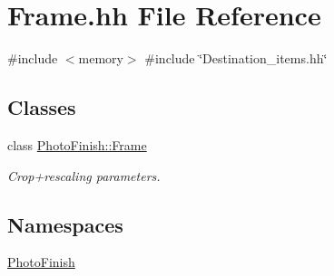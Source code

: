 \hypertarget{_frame_8hh}{}\section{Frame.\+hh File Reference}
\label{_frame_8hh}
{\ttfamily \#include $<$memory$>$}\newline
{\ttfamily \#include \char`\"{}Destination\+\_\+items.\+hh\char`\"{}}\newline
\subsection*{Classes}
\begin{DoxyCompactItemize}
\item 
class \hyperlink{class_photo_finish_1_1_frame}{Photo\+Finish\+::\+Frame}
\begin{DoxyCompactList}\small\item\em Crop+rescaling parameters. \end{DoxyCompactList}\end{DoxyCompactItemize}
\subsection*{Namespaces}
\begin{DoxyCompactItemize}
\item 
 \hyperlink{namespace_photo_finish}{Photo\+Finish}
\end{DoxyCompactItemize}
